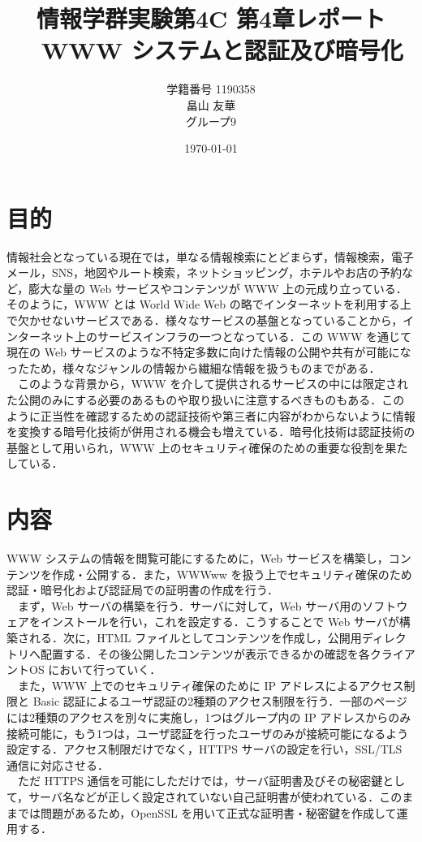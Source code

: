 \documentclass[a4j,titlepage]{jarticle}
\title{情報学群実験第4C 第4章レポート\\　WWW システムと認証及び暗号化}
\author{学籍番号 1190358\\
        畠山 友華\\
        グループ9}
\date{\today}
\begin{document}
\maketitle
\section{目的}
情報社会となっている現在では，単なる情報検索にとどまらず，情報検索，電子メール，SNS，地図やルート検索，ネットショッピング，ホテルやお店の予約など，膨大な量の Web サービスやコンテンツが WWW 上の元成り立っている．そのように，WWW とは World Wide Web の略でインターネットを利用する上で欠かせないサービスである．様々なサービスの基盤となっていることから，インターネット上のサービスインフラの一つとなっている．この WWW を通じて現在の Web サービスのような不特定多数に向けた情報の公開や共有が可能になったため，様々なジャンルの情報から繊細な情報を扱うものまでがある．\\
　このような背景から，WWW を介して提供されるサービスの中には限定された公開のみにする必要のあるものや取り扱いに注意するべきものもある．このように正当性を確認するための認証技術や第三者に内容がわからないように情報を変換する暗号化技術が併用される機会も増えている．暗号化技術は認証技術の基盤として用いられ，WWW 上のセキュリティ確保のための重要な役割を果たしている．


\section{内容}
WWW システムの情報を閲覧可能にするために，Web サービスを構築し，コンテンツを作成・公開する．また，WWWww を扱う上でセキュリティ確保のため認証・暗号化および認証局での証明書の作成を行う．\\
　まず，Web サーバの構築を行う．サーバに対して，Web サーバ用のソフトウェアをインストールを行い，これを設定する．こうすることで Web サーバが構築される．次に，HTML ファイルとしてコンテンツを作成し，公開用ディレクトリへ配置する．その後公開したコンテンツが表示できるかの確認を各クライアントOS において行っていく．\\
　また，WWW 上でのセキュリティ確保のために IP アドレスによるアクセス制限と Basic 認証によるユーザ認証の2種類のアクセス制限を行う．一部のページには2種類のアクセスを別々に実施し，1つはグループ内の IP アドレスからのみ接続可能に，もう1つは，ユーザ認証を行ったユーザのみが接続可能になるよう設定する．アクセス制限だけでなく，HTTPS サーバの設定を行い，SSL/TLS 通信に対応させる．\\
　ただ HTTPS 通信を可能にしただけでは，サーバ証明書及びその秘密鍵として，サーバ名などが正しく設定されていない自己証明書が使われている．このままでは問題があるため，OpenSSL を用いて正式な証明書・秘密鍵を作成して運用する．
\end{document}
